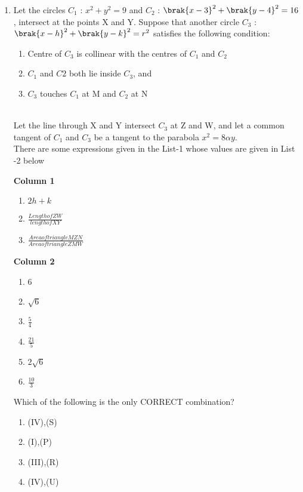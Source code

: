 \documentclass[journal,12pt,twocolumn]{IEEEtran}
\theoremstyle{remark}
\begin{document}
\begin{enumerate}
\item Let the circles $C_{1}$ : $x^2+y^2=9$ and $C_{2}$ : $\brak{x-3}^2+\brak{y-4}^2 = 16$, intersect at the points X and Y. Suppose that another circle $C_{3}$ : $\brak{x-h}^2+\brak{y-k}^2=r^2$ satisfies the following condition:\\
 
 
 \begin{enumerate}[label=(\roman*)]
 \item Centre of $C_{3}$ is collinear with the centres of $C_{1}$ and $C_{2}$
 \item $C_{1}$ and $C{2}$ both lie inside $C_{3}$, and

 \item $C_{3}$ touches $C_{1}$ at M and $C_{2}$ at N
\end{enumerate}\\
Let the line through X and Y intersect $C_{3}$ at Z and W, and let a common tangent of $C_{1}$ and $C_{3}$ be a tangent to the parabola $x^2=8\alpha y.$\\

There are some expressions given in the List-1 whose values are given in List -2 below
		
\begin{multicols}{2}	

\textbf{Column 1}
\begin{enumerate}[label=(\Alph*)]           
\item $2h+k$                                  
\item $\frac{Length of ZW}{length of XY}$     
\item $\frac{Area of triangle MZN}{Area of triangle ZMW}$                     
\end{enumerate}                              
\columnbreak
 \textbf{Column 2}
 \begin{enumerate}[label=(\alph*) , start=16]
 \item 6
 \item $\sqrt{6}$
 \item $\frac{5}{4}$                           
 \item $\frac{21}{5}$                          
 \item $2\sqrt{6}$                             
 \item $\frac{10}{3}$                         
 \end{enumerate}
 \end{multicols}
 Which of the following is the only CORRECT combination?                                    
\begin{enumerate}[label=(\alph*)]            
 \item (IV),(S)
 \item (I),(P)
 \item (III),(R)    
 \item (IV),(U)
 \end{enumerate}



\end{enumerate}
\end{document}
